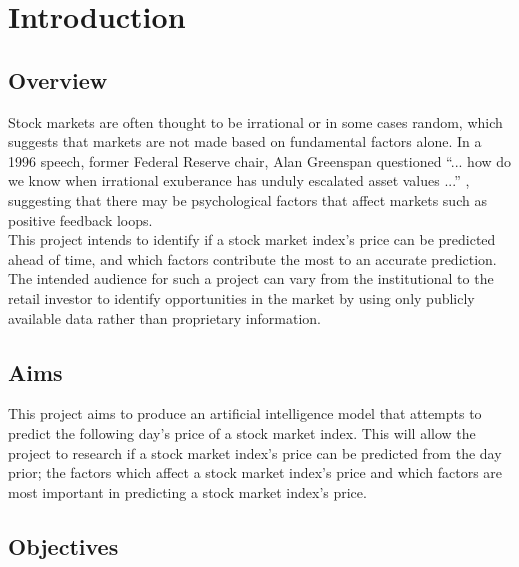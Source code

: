 \chapter{Introduction} \label{chap:introduction}

\section{Overview}

Stock markets are often thought to be irrational or in some cases random,
which suggests that markets are not made based on fundamental factors alone.
In a 1996 speech, former Federal Reserve chair, Alan Greenspan questioned ``... how do we know when irrational exuberance has unduly escalated asset
values ...'' \parencite{greenspan1996}, suggesting that there may be
psychological factors that affect markets such as positive feedback loops.\\

This project intends to identify if a stock market index's price can be predicted ahead
of time, and which factors contribute the most to an accurate prediction.
The intended audience for such a project can vary from the institutional to
the retail investor to identify opportunities in the market by using only
publicly available data rather than proprietary information.

\section{Aims}

This project aims to produce an artificial intelligence model that
attempts to predict the following day's price of a stock market index. This will
allow the project to research if a stock market index's price can be predicted
from the day prior; the factors which affect a stock market index's price and which
factors are most important in predicting a stock market index's price.

\section{Objectives}

